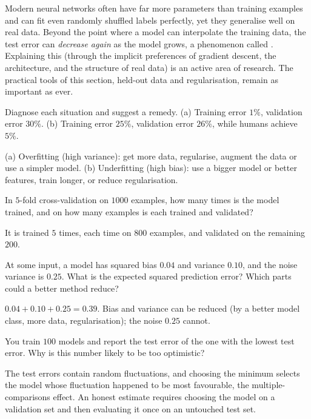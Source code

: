 \begin{remark}
Modern neural networks often have far more parameters than training examples
and can fit even randomly shuffled labels perfectly, yet they generalise well on
real data. Beyond the point where a model can interpolate the training data,
the test error can \emph{decrease again} as the model grows, a phenomenon called
. Explaining this (through the implicit preferences of
gradient descent, the architecture, and the structure of real data) is an active
area of research. The practical tools of this section, held-out data and
regularisation, remain as important as ever.
\end{remark}

\sectionexercises

\begin{exercise}
Diagnose each situation and suggest a remedy. (a) Training error $1\%$,
validation error $30\%$. (b) Training error $25\%$, validation error $26\%$,
while humans achieve $5\%$.
\end{exercise}
\begin{solution}
(a) Overfitting (high variance): get more data, regularise, augment the data or
use a simpler model. (b) Underfitting (high bias): use a bigger model or better
features, train longer, or reduce regularisation.
\end{solution}

\begin{exercise}
In $5$-fold cross-validation on $1000$ examples, how many times is the model
trained, and on how many examples is each trained and validated?
\end{exercise}
\begin{solution}
It is trained $5$ times, each time on $800$ examples, and validated on the
remaining $200$.
\end{solution}

\begin{exercise}
At some input, a model has squared bias $0.04$ and variance $0.10$, and the noise
variance is $0.25$. What is the expected squared prediction error? Which parts
could a better method reduce?
\end{exercise}
\begin{solution}
$0.04 + 0.10 + 0.25 = 0.39$. Bias and variance can be reduced (by a better model
class, more data, regularisation); the noise $0.25$ cannot.
\end{solution}

\begin{exercise}
You train $100$ models and report the test error of the one with the lowest test
error. Why is this number likely to be too optimistic?
\end{exercise}
\begin{solution}
The test errors contain random fluctuations, and choosing the minimum selects the
model whose fluctuation happened to be most favourable, the multiple-comparisons
effect. An honest estimate requires choosing the model on a validation set and
then evaluating it once on an untouched test set.
\end{solution}

